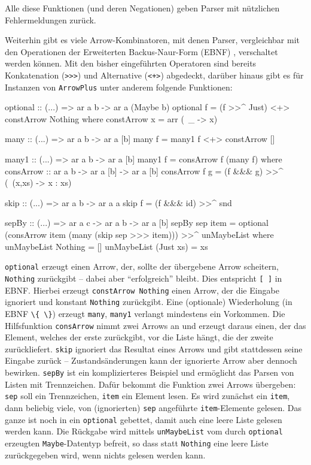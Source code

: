 \documentclass[12pt, a4paper, bibgerm]{scrbook}
\newenvironment{DIFnomarkup}{}{}
\newcommand\icode[1]{\lstinline?#1?}
\begin{document}
Alle diese Funktionen (und deren Negationen) geben Parser mit nützlichen
Fehlermeldungen zurück.

Weiterhin gibt es viele Arrow-Kombinatoren, mit denen Parser,
vergleichbar mit den Operationen der Erweiterten Backus-Naur-Form (EBNF)
\cite[S.43ff]{EBNF}, verschaltet werden können. Mit den bisher eingeführten
Operatoren sind bereits Konkatenation (\icode{>>>}) %
und Alternative (\icode{<+>}) abgedeckt, darüber hinaus gibt es für
Instanzen von \icode{ArrowPlus} unter anderem folgende Funktionen:

\begin{DIFnomarkup}\begin{code}
optional :: (...) => ar a b -> ar a (Maybe b)
optional f = (f >>^ Just) <+> constArrow Nothing
  where constArrow x = arr (\ _ -> x)

many :: (...) => ar a b -> ar a [b]
many f = many1 f <+> constArrow []

many1 :: (...) => ar a b -> ar a [b]
many1 f = consArrow f (many f)
  where consArrow :: ar a b -> ar a [b] -> ar a [b]
        consArrow f g = (f &&& g) >>^ (\ (x,xs) -> x : xs)

skip :: (...) => ar a b -> ar a a
skip f = (f &&& id) >>^ snd

sepBy :: (...) => ar a c -> ar a b -> ar a [b]
sepBy sep item =
  optional (consArrow item (many (skip sep >>> item))) >>^ unMaybeList
    where
      unMaybeList  Nothing  = []
      unMaybeList (Just xs) = xs
\end{code}\end{DIFnomarkup} %

\icode{optional} erzeugt einen Arrow, der, sollte der übergebene Arrow
scheitern, \icode{Nothing} zurückgibt -- dabei aber "`erfolgreich"'
bleibt. Dies entspricht \icode{[ ]} in EBNF. Hierbei erzeugt
\icode{constArrow Nothing} einen Arrow, der die Eingabe ignoriert und
konstant \icode{Nothing} zurückgibt. Eine (optionale) Wiederholung (in EBNF
\icode{\{ \}}) erzeugt \icode{many}, \icode{many1} verlangt mindestens
ein Vorkommen. Die Hilfsfunktion \icode{consArrow} nimmt zwei
Arrows an und erzeugt daraus einen, der das Element, welches der erste
zurückgibt, vor die Liste hängt, die der zweite zurückliefert.
\icode{skip} ignoriert das Resultat eines Arrows und gibt
stattdessen seine Eingabe zurück -- Zustandsänderungen kann der
ignorierte Arrow aber dennoch bewirken. \icode{sepBy} ist ein
komplizierteres Beispiel und ermöglicht das Parsen von Listen mit
Trennzeichen. Dafür bekommt die Funktion zwei Arrows übergeben:
\icode{sep} soll ein Trennzeichen, \icode{item} ein Element lesen. Es
wird zunächst ein \icode{item}, dann beliebig viele, von (ignorierten)
\icode{sep} angeführte \icode{item}-Elemente gelesen. Das ganze ist noch
in ein \icode{optional} gebettet, damit auch eine leere Liste gelesen
werden kann. Die Rückgabe wird mittels \icode{unMaybeList} vom durch
\icode{optional} erzeugten \icode{Maybe}-Datentyp befreit, so dass statt
\icode{Nothing} eine leere Liste zurückgegeben wird, wenn nichts gelesen
werden kann.
\end{document}
